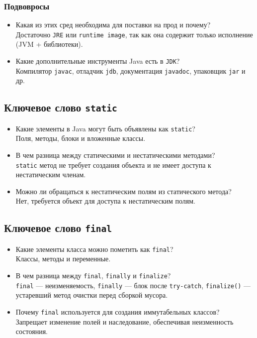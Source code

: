 \documentclass[a4paper,14pt]{article}
\begin{document}
\subsubsection*{Подвовросы}
\begin{itemize}
    \item Какая из этих сред необходима для поставки на прод и почему? \\
    Достаточно \texttt{JRE} или \texttt{runtime image}, так как она содержит только исполнение (JVM + библиотеки).
    \item Какие дополнительные инструменты Java есть в \texttt{JDK}? \\
    Компилятор \texttt{javac}, отладчик \texttt{jdb}, документация \texttt{javadoc}, упаковщик \texttt{jar} и др.
\end{itemize}
\subsection{Ключевое слово \texttt{static}}

\begin{itemize}
    \item Какие элементы в Java могут быть объявлены как \texttt{static}? \\
    Поля, методы, блоки и вложенные классы.
    \item В чем разница между статическими и нестатическими методами? \\
    \texttt{static} метод не требует создания объекта и не имеет доступа к нестатическим членам.
    \item Можно ли обращаться к нестатическим полям из статического метода? \\
    Нет, требуется объект для доступа к нестатическим полям.
\end{itemize}

\subsection{Ключевое слово \texttt{final}}

\begin{itemize}
    \item Какие элементы класса можно пометить как \texttt{final}? \\
    Классы, методы и переменные.
    \item В чем разница между \texttt{final}, \texttt{finally} и \texttt{finalize}? \\
    \texttt{final} — неизменяемость, \texttt{finally} — блок после \texttt{try-catch}, \texttt{finalize()} — устаревший метод очистки перед сборкой мусора.
    \item Почему \texttt{final} используется для создания иммутабельных классов? \\
    Запрещает изменение полей и наследование, обеспечивая неизменность состояния.
\end{itemize}
\end{document}

